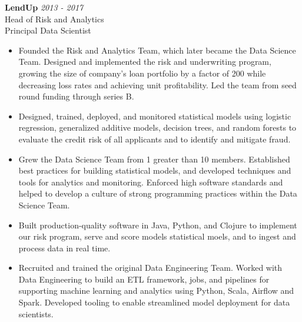 \documentclass[9pt]{article}
\newenvironment{changemargin}[2]{%
  \begin{list}{}{%
    \setlength{\topsep}{0pt}%
    \setlength{\leftmargin}{#1}%
    \setlength{\rightmargin}{#2}%
    \setlength{\listparindent}{\parindent}%
    \setlength{\itemindent}{\parindent}%
    \setlength{\parsep}{\parskip}%
  }%
  \item[]}{\end{list}
}
\newenvironment{body} {
  \vspace*{-16pt}
\begin{changemargin}{-0.25in}{-0.5in}
  }
{\end{changemargin}
}
\begin{document}
\begin{body}

  \vspace{14pt}

  \textbf{LendUp} \hfill \emph{2013 - 2017}\\
  Head of Risk and Analytics \\
  Principal Data Scientist
  \begin{itemize}


    \item Founded the Risk and Analytics Team, which later became the Data Science Team.  Designed and implemented the risk and underwriting program, growing the size of company's loan portfolio by a factor of 200 while decreasing loss rates and achieving unit profitability.  Led the team from seed round funding through series B. \\

    \item Designed, trained, deployed, and monitored statistical models using logistic regression, generalized additive models, decision trees, and random forests to evaluate the credit risk of all applicants and to identify and mitigate fraud. \\

    \item Grew the Data Science Team from 1 greater than 10 members. Established best practices for building statistical models, and developed techniques and tools for analytics and monitoring.  Enforced high software standards and helped to develop a culture of strong programming practices within the Data Science Team. \\

    \item Built production-quality software in Java, Python, and Clojure to implement our risk program, serve and score models statistical moels, and to ingest and process data in real time. \\

    \item Recruited and trained the original Data Engineering Team.  Worked with Data Engineering to build an ETL framework, jobs, and pipelines for supporting machine learning and analytics using Python, Scala, Airflow and Spark.  Developed tooling to enable streamlined model deployment for data scientists. \\
  \end{itemize}


\end{body}
\end{document}
